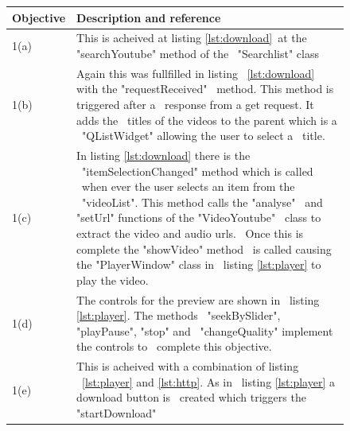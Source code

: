 \documentclass{article}
\begin{document}
\begin{figure}[H]
    \begin{tabular} {| p{2cm} | p{10cm} |}
        \hline
        \textbf{Objective}   &         \textbf{Description and reference}   \\ \hline
        1(a)                 &This is acheived at listing \ref{lst:download}\
                              at the "searchYoutube" method of the          \
                              "Searchlist" class                            \\ \hline
        1(b)                 &Again this was fullfilled in listing          \
                              \ref{lst:download} with the "requestReceived" \
                              method. This method is triggered after a      \
                              response from a get request. It adds the      \
                              titles of the videos to the parent which is a \
                              "QListWidget" allowing the user to select a   \
                              title.                                        \\ \hline
        1(c)                 & In listing \ref{lst:download} there is the   \
                              "itemSelectionChanged" method which is called \
                              when ever the user selects an item from the   \
                              "videoList". This method calls  the "analyse" \
                              and "setUrl" functions of the "VideoYoutube"  \
                              class to extract the video and audio urls.    \
                              Once this is complete the "showVideo" method  \
                              is called causing the "PlayerWindow" class in \
                              listing \ref{lst:player} to play the video.   \\ \hline
        1(d)                &The controls for the preview are shown in      \
                             listing \ref{lst:player}. The methods          \
                             "seekBySlider", "playPause", "stop" and        \
                             "changeQuality" implement the controls to      \
                             complete this objective.                       \\ \hline
        1(e)                &This is acheived with a combination of listing \
                             \ref{lst:player} and \ref{lst:http}. As in     \
                             listing \ref{lst:player} a download button is  \
                             created which triggers the "startDownload"     \

\end{tabular}
\end{figure}
\end{document}
